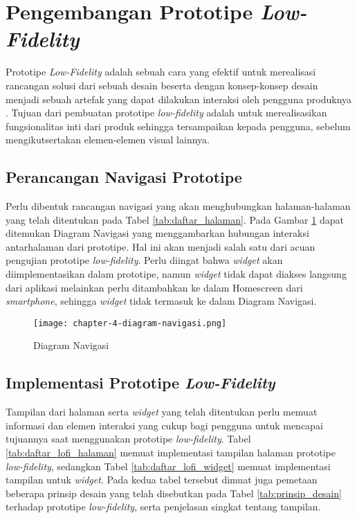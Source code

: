 \section{Pengembangan Prototipe \textit{Low-Fidelity}}
\label{sec:lofi}

Prototipe \textit{Low-Fidelity} adalah sebuah cara yang efektif untuk merealisasi rancangan solusi dari sebuah desain beserta dengan konsep-konsep desain menjadi sebuah artefak yang dapat dilakukan interaksi oleh pengguna produknya \parencite{adobe2017prototype}. Tujuan dari pembuatan prototipe \textit{low-fidelity} adalah untuk merealisasikan fungsionalitas inti dari produk sehingga tersampaikan kepada pengguna, sebelum mengikutsertakan elemen-elemen visual lainnya. 

\newpage

\subsection{Perancangan Navigasi Prototipe}
\label{subsec:lofi_navigasi}
Perlu dibentuk rancangan navigasi yang akan menghubungkan halaman-halaman yang telah ditentukan pada Tabel \ref{tab:daftar_halaman}. Pada Gambar \ref{fig:diagram_navigasi} dapat ditemukan Diagram Navigasi yang menggambarkan hubungan interaksi antarhalaman dari prototipe. Hal ini akan menjadi salah satu dari acuan pengujian prototipe \textit{low-fidelity}.
Perlu diingat bahwa \textit{widget} akan diimplementasikan dalam prototipe, namun \textit{widget} tidak dapat diakses langsung dari aplikasi melainkan perlu ditambahkan ke dalam Homescreen dari \textit{smartphone}, sehingga \textit{widget} tidak termasuk ke dalam Diagram Navigasi.  

\newpage

\begin{landscape}
  \begin{figure}[h]
    \centering
    \texttt{[image: chapter-4-diagram-navigasi.png]}
    \caption{Diagram Navigasi}
    \label{fig:diagram_navigasi}
  \end{figure}
\end{landscape}

\newpage


\subsection{Implementasi Prototipe \textit{Low-Fidelity}}
\label{subsec:lofi_implementasi}
Tampilan dari halaman serta \textit{widget} yang telah ditentukan perlu memuat informasi dan elemen interaksi yang cukup bagi pengguna untuk mencapai tujuannya saat menggunakan prototipe \textit{low-fidelity}. Tabel \ref{tab:daftar_lofi_halaman} memuat implementasi tampilan halaman prototipe \textit{low-fidelity}, sedangkan Tabel \ref{tab:daftar_lofi_widget} memuat implementasi tampilan untuk \textit{widget}. Pada kedua tabel tersebut dimuat juga pemetaan beberapa prinsip desain yang telah disebutkan pada Tabel \ref{tab:prinsip_desain} terhadap prototipe \textit{low-fidelity}, serta penjelasan singkat tentang tampilan.

